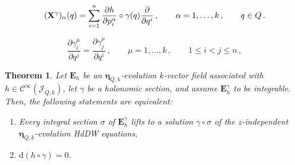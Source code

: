 \documentclass[10pt,a4paper]{amsart}
\newtheorem{theorem}{Theorem}
\newcommand{\Cinfty}{\mathscr{C}^\infty}
\newcommand{\dd}{\mathrm{d}}
\begin{document}
\begin{equation}\label{eq:ProjZgamma}
({\bf X}^\gamma)_\alpha(q)=\sum_{i=1}^n\frac{\partial h}{\partial p^\alpha_i}\circ\gamma(q)\frac{\partial}{\partial q^i}\,,\qquad \alpha=1,\dotsc,k\,,\qquad q\in Q\,.
\end{equation}

\begin{equation}\label{eq:closedgamma2}
\frac{\partial \gamma_i^\mu}{\partial q^j} =
\frac{\partial \gamma_j^\mu}{\partial q^i}\,,\qquad \mu=1,\dotsc,k\,,\qquad 1\leq i<j\leq n\,,
\end{equation}

\begin{theorem}\label{theo:evolutionHJzindependent}
Let $\mathbf{E}_h$ be an ${\bm \eta}_{Q,k}$-evolution $k$-vector field associated with $h\in \Cinfty(\mathcal{J}_{Q,k})$, let $\gamma$ be a holonomic section, and assume $\mathbf{E}_h^\gamma$ to be integrable. Then, the following statements are equivalent:
\begin{enumerate}
\item Every integral section $\sigma$ of $\mathbf{E}_h^\gamma$ lifts to a solution $\gamma\circ\sigma$ of the $z$-independent ${\bm \eta}_{Q,k}$-evolution HdDW equations,
\item $\dd(h\circ\gamma)=0$.
\end{enumerate}
\end{theorem}
\end{document}

